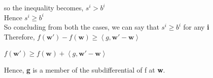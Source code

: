 \documentclass[a4paper,11pt]{article}
\begin{document}
\begin{mlsolution}
so the inequality becomes, \begin{math} s^{i} > b^{i} \end{math}\\

Hence \begin{math} s^{i} \geq b^{i} \end{math}\\

So concluding from both the cases, we can say that \begin{math} s^{i} \geq b^{i} \end{math} for any \textbf{i}\\

Therefore, \begin{math}
f\left ( \textbf{w}{}' \right ) - f\left ( \textbf{w} \right ) \geq  \left \langle g, \textbf{w}{}' - \textbf{w} \right \rangle
\end{math}


\begin{math}
f\left ( \textbf{w}{}' \right ) \geq f\left ( \textbf{w} \right ) + \left \langle g, \textbf{w}{}' - \textbf{w} \right \rangle
\end{math}

Hence, \textbf{g} is a member of the subdifferential of f at \textbf{w}.
\end{mlsolution}
\end{document}
